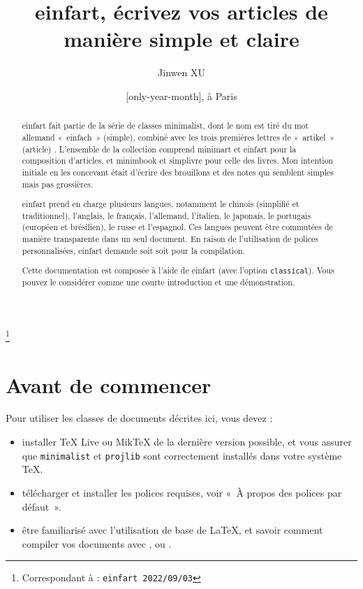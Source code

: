 \documentclass[classical, simple name]{einfart}
\newcommand{\classoption}[1]{\texttt{\textcolor{code-option}{#1}}}
\providecommand{\minimalist}{\textsf{minimalist}}
\providecommand{\minimart}{\textsf{minimart}}
\providecommand{\minimbook}{\textsf{minimbook}}
\providecommand{\einfart}{\textsf{einfart}}
\providecommand{\simplivre}{\textsf{simplivre}}
\let\LevelOneTitle\section
\begin{document}
\def\PackageVersion{2022/09/03}

\title{\einfart{}, écrivez vos articles de manière simple et claire}
\author{Jinwen XU}
\thanks{Correspondant à : \texttt{\einfart{} \PackageVersion}}
\date{\TheDate{\PackageVersion}[only-year-month], à Paris}

\maketitle

\begin{abstract}
    \einfart{} fait partie de la série de classes \minimalist{}, dont le nom est tiré du mot allemand «~einfach~» (simple), combiné avec les trois premières lettres de «~artikel~» (article) . L'ensemble de la collection comprend \minimart{} et \einfart{} pour la composition d'articles, et \minimbook{} et \simplivre{} pour celle des livres. Mon intention initiale en les concevant était d'écrire des brouillons et des notes qui semblent simples mais pas grossières.

    \einfart{} prend en charge plusieurs langues, notamment le chinois (simplifié et traditionnel), l'anglais, le français, l'allemand, l'italien, le japonais, le portugais (européen et brésilien), le russe et l'espagnol. Ces langues peuvent être commutées de manière transparente dans un seul document. En raison de l'utilisation de polices personnalisées, \einfart{} demande soit  soit  pour la compilation.

    Cette documentation est composée à l'aide de \einfart{} (avec l'option \classoption{classical}). Vous pouvez le considérer comme une courte introduction et une démonstration.
\end{abstract}


\setcounter{tocdepth}{2}
\tableofcontents


\LevelOneTitle*{Avant de commencer}

Pour utiliser les classes de documents décrites ici, vous devez :
\begin{itemize}
      \item installer TeX Live ou MikTeX de la dernière version possible, et vous assurer que \texttt{minimalist} et \texttt{projlib} sont correctement installés dans votre système \TeX{}.
      \item télécharger et installer les polices requises, voir «~À propos des polices par défaut~».
      \item être familiarisé avec l'utilisation de base de \LaTeX{}, et savoir comment compiler vos documents avec ,  ou .
\end{itemize}
\end{document}
